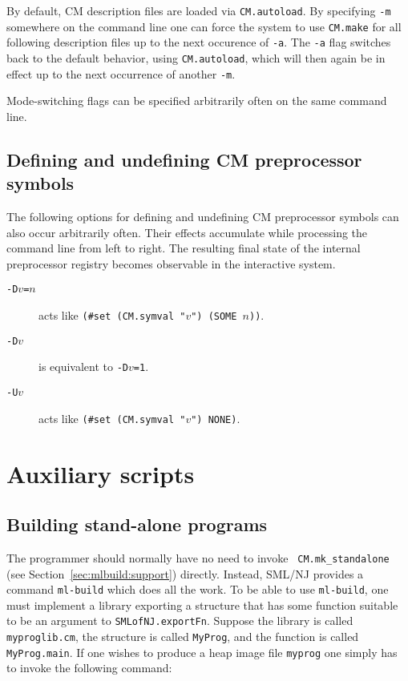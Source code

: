 \documentclass[titlepage,letterpaper]{article}
\begin{document}
By default, CM description files are loaded via {\tt CM.autoload}.  By
specifying {\tt -m} somewhere on the command line one can force the
system to use {\tt CM.make} for all following description files up to
the next occurence of {\tt -a}.  The {\tt -a} flag switches back to
the default behavior, using {\tt CM.autoload}, which will then again
be in effect up to the next occurrence of another {\tt -m}.

Mode-switching flags can be specified arbitrarily often on the same
command line.

\subsection{Defining and undefining CM preprocessor symbols}
\label{sec:cmdline:defundef}

The following options for defining and undefining CM preprocessor
symbols can also occur arbitrarily often.  Their effects accumulate
while processing the command line from left to right.  The resulting
final state of the internal preprocessor registry becomes observable
in the interactive system.

\begin{description}
\item[{\tt -D$v$=$n$}] acts like {\tt (\#set (CM.symval "$v$") (SOME $n$))}.
\item[{\tt -D$v$}] is equivalent to {\tt -D$v$=1}.
\item[{\tt -U$v$}] acts like {\tt (\#set (CM.symval "$v$") NONE)}.
\end{description}

\section{Auxiliary scripts}

\subsection{Building stand-alone programs}
\label{sec:mlbuild}

The programmer should normally have no need to invoke {\tt
CM.mk\_standalone} (see Section~\ref{sec:mlbuild:support}) directly.
Instead, SML/NJ provides a command {\tt ml-build} which does all the
work.  To be able to use {\tt ml-build}, one must implement a library
exporting a structure that has some function suitable to be an
argument to {\tt SMLofNJ.exportFn}.  Suppose the library is called
{\tt myproglib.cm}, the structure is called {\tt MyProg}, and the
function is called {\tt MyProg.main}.  If one wishes to produce a heap
image file {\tt myprog} one simply has to invoke the following
command:
\end{document}
